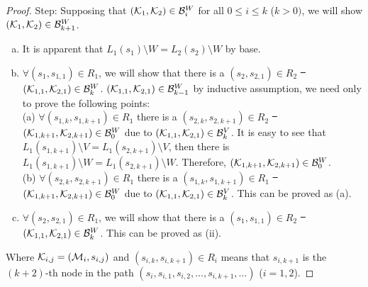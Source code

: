 \documentclass{article}
\begin{document}
\begin{proof}
Step: Supposing that $({\cal K}_1, {\cal K}_2) \in {\cal B}_i^W$ for all $0 \leq i \leq k$ ($k > 0)$, we will show $({\cal K}_1, {\cal K}_2) \in {\cal B}_{k+1}^W$.
\begin{enumerate} [(a)]
  \item It is apparent that $L_1(s_1) \setminus W = L_2(s_2) \setminus W$ by base.
  \item $\forall (s_1, s_{1,1}) \in R_1$, we will show that there is a $(s_2, s_{2, 1}) \in R_2$ \st\ $({\cal K}_{1,1}, {\cal K}_{2,1})\in {\cal B}_k^W$. $({\cal K}_{1,1}, {\cal K}_{2,1})\in {\cal B}_{k-1}^W$ by inductive assumption, we need only to prove the following points:\\
      (a) $\forall (s_{1, k}, s_{1, k+1}) \in R_1$ there is a $(s_{2, k}, s_{2, k+1})\in R_2$ \st\ $({\cal K}_{1,k+1}, {\cal K}_{2,k+1})\in {\cal B}_0^W$ due to $({\cal K}_{1,1}, {\cal K}_{2,1})\in {\cal B}_{k}^V$. It is easy to see that $L_1(s_{1, k+1}) \setminus V = L_1(s_{2, k+1}) \setminus V$, then there is $L_1(s_{1, k+1})\setminus W = L_1(s_{2, k+1}) \setminus W$. Therefore, $({\cal K}_{1,k+1}, {\cal K}_{2,k+1})\in {\cal B}_0^W$.\\
      (b) $\forall (s_{2, k}, s_{2, k+1}) \in R_1$ there is a $(s_{1, k}, s_{1, k+1}) \in R_1$ \st\ $({\cal K}_{1,k+1}, {\cal K}_{2,k+1})\in {\cal B}_0^W$ due to $({\cal K}_{1,1}, {\cal K}_{2,1})\in {\cal B}_{k}^V$. This can be proved as (a).
  \item $\forall (s_2, s_{2,1}) \in R_1$, we will show that there is a $(s_1, s_{1, 1}) \in R_2$ \st\ $({\cal K}_{1,1}, {\cal K}_{2,1})\in {\cal B}_k^W$. This can be proved as (ii).
\end{enumerate}
Where ${\cal K}_{i, j}=({\cal M}_i, s_{i,j})$ and $(s_{i, k}, s_{i, k+1}) \in R_i$ means that $s_{i, k+1}$ is the $(k+2)$-th node in the path
 $(s_i, s_{i, 1}, s_{i,2}, \dots , s_{i, k+1}, \dots)$ ($i=1,2$).
\end{proof}

\end{document}

